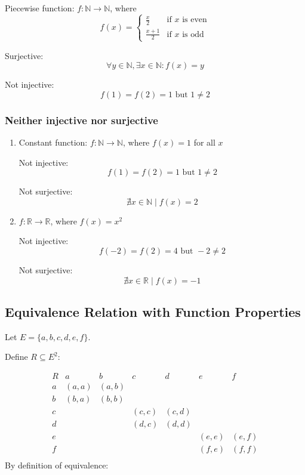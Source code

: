 \documentclass[12pt,a4paper,openany]{article}
\begin{document}
Piecewise function: $f : \mathbb{N} \to \mathbb{N}$, where
\[f(x) = \begin{cases} \frac{x}{2} & \text{if } x \text{ is even} \\[0.5em] \frac{x+1}{2} & \text{if } x \text{ is odd} \end{cases}\]

Surjective: \[\forall y \in \mathbb{N}, \exists x \in \mathbb{N} : f(x) = y\]

Not injective: \[f(1) = f(2) = 1 \text{ but } 1 \neq 2\]

\subsubsection{Neither injective nor surjective}

\begin{enumerate}
\item Constant function: $f : \mathbb{N} \to \mathbb{N}$, where $f(x) = 1$ for all $x$

   Not injective: \[f(1) = f(2) = 1 \text{ but } 1 \neq 2\]

   Not surjective: \[\nexists x \in \mathbb{N} \mid f(x) = 2\]

\item $f : \mathbb{R} \to \mathbb{R}$, where $f(x) = x^2$

   Not injective: \[f(-2) = f(2) = 4 \text{ but } -2 \neq 2\]

   Not surjective: \[\nexists x \in \mathbb{R} \mid f(x) = -1\]
\end{enumerate}

\subsection{Equivalence Relation with Function Properties}

Let $E = \{a, b, c, d, e, f\}$.

Define $R \subseteq E^2$:

\[
\begin{array}{c|cccccc}
R & a & b & c & d & e & f \\
\hline
a & (a,a) & (a,b) &  &  &  &  \\
b & (b,a) & (b,b) &  &  &  &  \\
c &  &  & (c,c) & (c,d) &  &  \\
d &  &  & (d,c) & (d,d) &  &  \\
e &  &  &  &  & (e,e) & (e,f) \\
f &  &  &  &  & (f,e) & (f,f) \\
\end{array}
\]
\newpage
By definition of equivalence:
\end{document}
